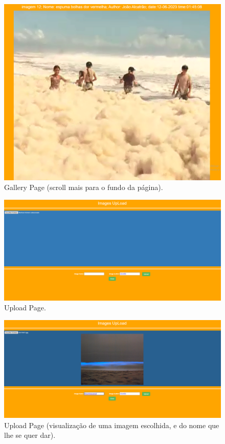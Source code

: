 \documentclass{report}
\begin{document}
    \begin{figure}[!hbtp]
        \centering 
        \includegraphics[scale=0.450]{Images_code/0 - galeria 2.png}
        \caption{\label{Upload}Gallery Page (scroll mais para o fundo da página).}
    \end{figure}

    \begin{figure}[!hbtp]
        \centering 
        \includegraphics[scale=0.290]{Images_code/0 - upload.png}
        \caption{\label{Upload}Upload Page.}
    \end{figure}

    \begin{figure}[!hbtp]
        \centering 
        \includegraphics[scale=0.29]{Images_code/0 - upload 2.png}
        \caption{\label{Upload}Upload Page (visualização de uma imagem escolhida, e do nome que lhe se quer dar).}
    \end{figure}
\end{document}
